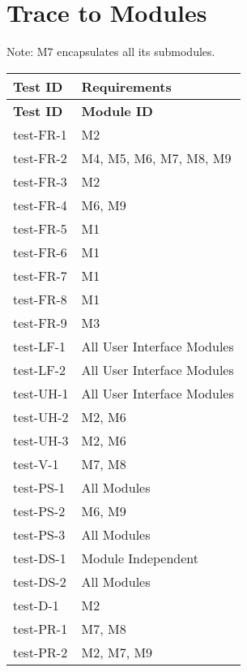 \documentclass[12pt, titlepage]{article}
\begin{document}
\section{Trace to Modules}	
Note: M7 encapsulates all its submodules.
\begin{center}
    \begin{longtable}{|>{\centering\arraybackslash}p{4cm}|>{\centering\arraybackslash}p{10cm}|}
    \hline
    \textbf{Test ID} & \textbf{Requirements} \\
    \hline
    \endfirsthead
    
    \hline
    \textbf{Test ID} & \textbf{Module ID} \\
    \hline
    \endhead
    
    test-FR-1 &  M2\\
    \hline
    test-FR-2 & M4, M5, M6, M7, M8, M9\\
    \hline
    test-FR-3 & M2 \\
    \hline
    test-FR-4 & M6, M9 \\
    \hline
    test-FR-5 & M1 \\
    \hline
    test-FR-6 & M1 \\
    \hline
    test-FR-7 & M1 \\
    \hline
    test-FR-8 & M1 \\
    \hline
    test-FR-9 & M3 \\
    \hline
    test-LF-1 & All User Interface Modules \\
    \hline
    test-LF-2 & All User Interface Modules \\
    \hline
    test-UH-1 & All User Interface Modules \\
    \hline
    test-UH-2 & M2, M6 \\
    \hline
    test-UH-3 & M2, M6 \\
    \hline
    test-V-1 &  M7, M8 \\
    \hline
    test-PS-1 &  All Modules\\
    \hline
    test-PS-2 &  M6, M9 \\
    \hline
    test-PS-3 & All Modules \\
    \hline
    test-DS-1 &  Module Independent\\
    \hline
    test-DS-2 & All Modules\\
    \hline
    test-D-1 & M2\\
    \hline
    test-PR-1 &  M7, M8\\
    \hline
    test-PR-2 &  M2, M7, M9\\
    \hline

\end{longtable}
\end{center}
\end{document}
